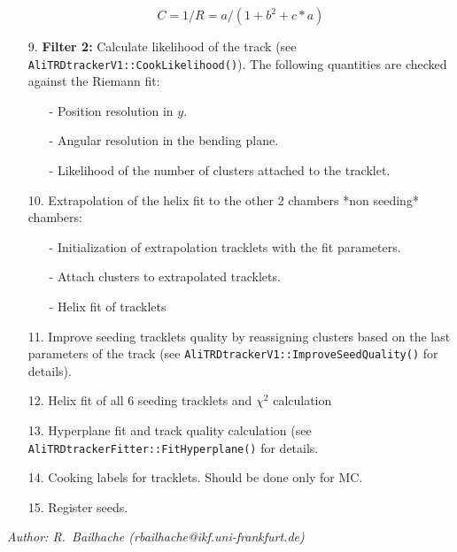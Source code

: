 \documentclass{alicetdr}
\begin{document}
\begin{itemize}
          \begin{equation}
          C = 1/R = a/(1 + b^{2} + c*a)
          \end{equation}
\item[9.] {\bf Filter 2:} Calculate likelihood of the track
          (see {\tt AliTRDtrackerV1::CookLikelihood()}). The following quantities are
          checked against the Riemann fit:
          \begin{itemize}
          \item[-] Position resolution in $y$.
          \item[-] Angular resolution in the bending plane.
          \item[-] Likelihood of the number of clusters attached to the tracklet.
          \end{itemize}
\item[10.] Extrapolation of the helix fit to the other 2 chambers *non seeding*
          chambers:
          \begin{itemize}
          \item[-] Initialization of extrapolation tracklets with the fit parameters.
          \item[-] Attach clusters to extrapolated tracklets.
          \item[-] Helix fit of tracklets
          \end{itemize}
\item[11.] Improve seeding tracklets quality by reassigning clusters based on the
          last parameters of the track (see {\tt AliTRDtrackerV1::ImproveSeedQuality()}
          for details).
\item[12.] Helix fit of all 6 seeding tracklets and $\chi^{2}$ calculation
\item[13.] Hyperplane fit and track quality calculation
          (see {\tt AliTRDtrackerFitter::FitHyperplane()} for details.
\item[14.] Cooking labels for tracklets. Should be done only for MC.
\item[15.] Register seeds.
\end{itemize}

%
\newpage
\setcounter{chapter}{3}
\setcounter{section}{0}
%
{\it Author: R.~Bailhache (rbailhache@ikf.uni-frankfurt.de)}
\smallskip
\\
%
\end{document}
